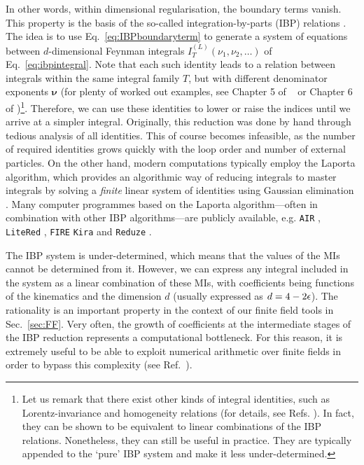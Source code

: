 \documentclass[main.tex]{subfiles}
\begin{document}
In other words, within dimensional regularisation, the boundary terms vanish. This property is the basis of the so-called integration-by-parts (IBP) relations \cite{Chetyrkin:1981qh}. The idea is to use Eq.~\ref{eq:IBPboundaryterm} to generate a system of equations between $d$-dimensional Feynman integrals $I_T^{(L)}(\nu_1, \nu_2, \ldots)$ of Eq.~\ref{eq:ibpintegral}. Note that each such identity leads to a relation between integrals within the same integral family $T$, but with different denominator exponents $\bm{\nu}$ (for plenty of worked out examples, see Chapter 5 of ~\cite{smirnov2006feynman} or Chapter 6 of \cite{Weinzierl:2022eaz})\footnote{Let us remark that there exist other kinds of integral identities, such as Lorentz-invariance and homogeneity relations (for details, see Refs. \cite{grozin:2011mt, Lee:2008tj, Lee:2012cn}). In fact, they can be shown to be equivalent to linear combinations of the IBP relations. Nonetheless, they can still be useful in practice. They are typically appended to the `pure' IBP system and make it less under-determined.}. Therefore, we can use these identities to lower or raise the indices until we arrive at a simpler integral. Originally, this reduction was done by hand through tedious analysis of all identities. This of course becomes infeasible, as the number of required identities grows quickly with the loop order and number of external particles. On the other hand, modern computations typically employ the Laporta algorithm, which provides an algorithmic way of reducing integrals to master integrals by solving a \textit{finite} linear system of identities using Gaussian elimination \cite{Laporta:2001dd}. Many computer programmes based on the Laporta algorithm---often in combination with other IBP algorithms---are publicly available, e.g. \texttt{AIR} \cite{Anastasiou:2004vj}, \texttt{LiteRed} \cite{Lee:2012cn, Lee:2013mka}, \texttt{FIRE} \cite{Smirnov:2008iw, Smirnov:2019qkx} \texttt{Kira} \cite{Maierhofer:2017gsa, Klappert:2020nbg} and \texttt{Reduze} \cite{Studerus:2009ye, vonManteuffel:2012np}.

The IBP system is under-determined, which means that the values of the MIs cannot be determined from it. However, we can express any integral included in the system as a linear combination of these MIs, with coefficients being functions of the kinematics and the dimension $d$ (usually expressed as $d=4-2\epsilon$). The rationality is an important property in the context of our finite field tools in Sec.~\ref{sec:FF}. Very often, the growth of coefficients at the intermediate stages of the IBP reduction represents a computational bottleneck. For this reason, it is extremely useful to be able to exploit numerical arithmetic over finite fields in order to bypass this complexity (see Ref.~\cite{Peraro:2019svx}).
\end{document}
